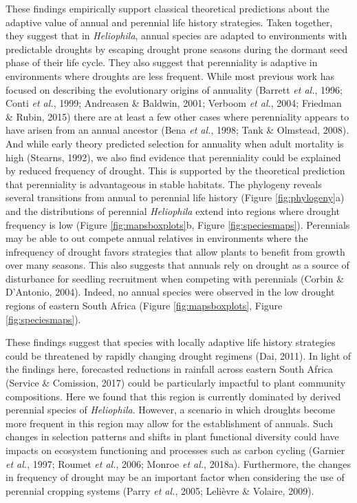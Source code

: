 \documentclass[man,floatsintext]{apa6}
\theoremstyle{definition}
\theoremstyle{definition}
\theoremstyle{definition}
\theoremstyle{remark}
\begin{document}
These findings empirically support classical theoretical predictions
about the adaptive value of annual and perennial life history
strategies. Taken together, they suggest that in \emph{Heliophila},
annual species are adapted to environments with predictable droughts by
escaping drought prone seasons during the dormant seed phase of their
life cycle. They also suggest that perenniality is adaptive in
environments where droughts are less frequent. While most previous work
has focused on describing the evolutionary origins of annuality (Barrett
\emph{et al.}, 1996; Conti \emph{et al.}, 1999; Andreasen \& Baldwin,
2001; Verboom \emph{et al.}, 2004; Friedman \& Rubin, 2015) there are at
least a few other cases where perenniality appears to have arisen from
an annual ancestor (Bena \emph{et al.}, 1998; Tank \& Olmstead, 2008).
And while early theory predicted selection for annuality when adult
mortality is high (Stearns, 1992), we also find evidence that
perenniality could be explained by reduced frequency of drought. This is
supported by the theoretical prediction that perenniality is
advantageous in stable habitats. The phylogeny reveals several
transitions from annual to perennial life history (Figure
\ref{fig:phylogeny}a) and the distributions of perennial
\emph{Heliophila} extend into regions where drought frequency is low
(Figure \ref{fig:mapsboxplots}b, Figure \ref{fig:speciesmaps}).
Perennials may be able to out compete annual relatives in environments
where the infrequency of drought favors strategies that allow plants to
benefit from growth over many seasons. This also suggests that annuals
rely on drought as a source of disturbance for seedling recruitment when
competing with perennials (Corbin \& D'Antonio, 2004). Indeed, no annual
species were observed in the low drought regions of eastern South Africa
(Figure \ref{fig:mapsboxplots}, Figure \ref{fig:speciesmaps}).

These findings suggest that species with locally adaptive life history
strategies could be threatened by rapidly changing drought regimens
(Dai, 2011). In light of the findings here, forecasted reductions in
rainfall across eastern South Africa (Service \& Comission, 2017) could
be particularly impactful to plant community compositions. Here we found
that this region is currently dominated by derived perennial species of
\emph{Heliophila}. However, a scenario in which droughts become more
frequent in this region may allow for the establishment of annuals. Such
changes in selection patterns and shifts in plant functional diversity
could have impacts on ecosystem functioning and processes such as carbon
cycling (Garnier \emph{et al.}, 1997; Roumet \emph{et al.}, 2006; Monroe
\emph{et al.}, 2018a). Furthermore, the changes in frequency of drought
may be an important factor when considering the use of perennial
cropping systems (Parry \emph{et al.}, 2005; Lelièvre \& Volaire, 2009).
\end{document}
